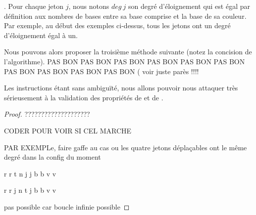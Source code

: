 . Pour chaque jeton $j$, nous notons $deg \ j$ son degré d'éloignement qui est égal par définition aux nombres de bases entre sa base comprise et la base de sa couleur.
Par exemple, au début des exemples ci-dessus, tous les jetons ont un degré d'éloignement égal à un.


\medskip

Nous pouvons alors proposer la troisième méthode suivante (notez la concision de l'algorithme).   PAS BON PAS BON PAS BON PAS BON PAS BON PAS BON PAS BON PAS BON PAS BON PAS BON ( voir juste parès !!!!

\bigskip

\begin{algo}
	\vspace{0.4em}
\end{algo}


\bigskip

Les instructions étant sans ambiguïté, nous allons pouvoir nous attaquer très sérieusement à la validation des propriétés de  et de .

\begin{proof}
	????????????????????
	
	CODER POUR VOIR SI CEL MARCHE 
	
	PAR EXEMPLe, faire gaffe au cas ou les quatre jetons déplaçables ont le même degré dans la config du moment
	
	r r t n j j b b v v
	
	r r j n t j b b v v
	
	pas possible car boucle infinie possible
\end{proof}
